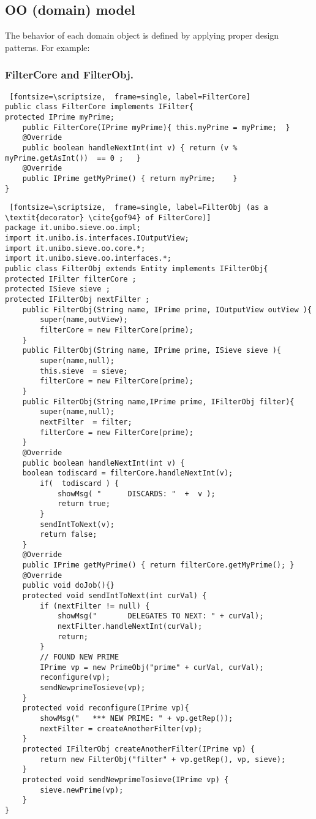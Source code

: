 \documentclass{../llncs}
\begin{document}
\subsection{OO (domain) model}

The behavior of each domain object is defined by applying proper design patterns. For example:


\subsubsection{FilterCore and FilterObj.\\}

\begin{Verbatim} [fontsize=\scriptsize,  frame=single, label=FilterCore]
public class FilterCore implements IFilter{
protected IPrime myPrime;
	public FilterCore(IPrime myPrime){ this.myPrime = myPrime;	}	
	@Override
	public boolean handleNextInt(int v) { return (v % myPrime.getAsInt())  == 0 ; 	}
	@Override
	public IPrime getMyPrime() { return myPrime;	}
}
\end{Verbatim}



\begin{Verbatim} [fontsize=\scriptsize,  frame=single, label=FilterObj (as a \textit{decorator} \cite{gof94} of FilterCore)]
package it.unibo.sieve.oo.impl;
import it.unibo.is.interfaces.IOutputView;
import it.unibo.sieve.oo.core.*;
import it.unibo.sieve.oo.interfaces.*;
public class FilterObj extends Entity implements IFilterObj{
protected IFilter filterCore ;
protected ISieve sieve ;
protected IFilterObj nextFilter ;
	public FilterObj(String name, IPrime prime, IOutputView outView ){
		super(name,outView);
		filterCore = new FilterCore(prime);
	}	
	public FilterObj(String name, IPrime prime, ISieve sieve ){
		super(name,null);
		this.sieve 	= sieve;
		filterCore = new FilterCore(prime);
	}	
	public FilterObj(String name,IPrime prime, IFilterObj filter){
		super(name,null);
		nextFilter 	= filter;
		filterCore = new FilterCore(prime);
	}	
	@Override
	public boolean handleNextInt(int v) {
	boolean todiscard = filterCore.handleNextInt(v);
		if(  todiscard ) {
			showMsg( "		DISCARDS: "  +  v );
			return true;
		}
		sendIntToNext(v);
		return false;
	}
	@Override
	public IPrime getMyPrime() { return filterCore.getMyPrime(); }
	@Override
	public void doJob(){}  	
	protected void sendIntToNext(int curVal) {
		if (nextFilter != null) {
			showMsg("		DELEGATES TO NEXT: " + curVal);
			nextFilter.handleNextInt(curVal);
			return;
		}
		// FOUND NEW PRIME
		IPrime vp = new PrimeObj("prime" + curVal, curVal);
		reconfigure(vp);
		sendNewprimeTosieve(vp);
	}	
	protected void reconfigure(IPrime vp){
		showMsg("	*** NEW PRIME: " + vp.getRep());
		nextFilter = createAnotherFilter(vp);		
	}
	protected IFilterObj createAnotherFilter(IPrime vp) {
		return new FilterObj("filter" + vp.getRep(), vp, sieve);
	}
	protected void sendNewprimeTosieve(IPrime vp) {
		sieve.newPrime(vp);
	}
}
\end{Verbatim}
\end{document}
